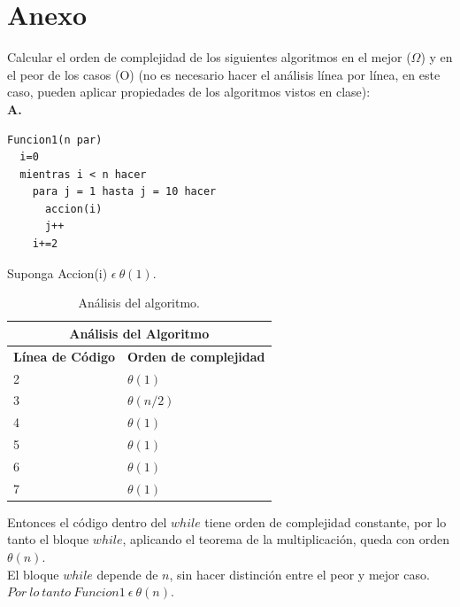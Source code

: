 \documentclass[12pt]{report}
\begin{document}
\section{Anexo}
	
Calcular el orden de complejidad de los siguientes algoritmos en el mejor ($\Omega$) y en el peor de los casos (O) (no es necesario hacer el análisis línea por línea, en este caso, pueden aplicar propiedades de los algoritmos vistos en clase):\\

	\textbf{A.}
	\lstset{language=vhdl, breaklines=true, basicstyle=\footnotesize}
	\lstset{numbers=left, numberstyle=\tiny, stepnumber=1, numbersep=10pt}
	\begin{lstlisting}
Funcion1(n par)
  i=0
  mientras i < n hacer
    para j = 1 hasta j = 10 hacer
      accion(i)
      j++
    i+=2
	\end{lstlisting}
	Suponga Accion(i) $\epsilon \ \theta (1).$\\
	
	\begin{table}[htbp]
		\begin{center}
			\begin{tabular}{|l|l|}
				\hline
				\multicolumn{2}{|c|}{Análisis del Algoritmo} \\ 
				\hline
				\textbf{Línea de Código} & \textbf{Orden de complejidad}\\
				\hline
				2 & $\theta (1)$ \\ \hline
				3 & $\theta (n/2)$ \\ \hline
				4 & $\theta (1)$ \\ \hline
				5 & $\theta (1)$ \\ \hline
				6 & $\theta (1)$ \\ \hline
				7 & $\theta (1)$ \\ \hline
			\end{tabular}
			\caption{Análisis del algoritmo.}
			\label{tabla:analisis3}
		\end{center}
	\end{table}
	
	Entonces el código dentro del $while$ tiene orden de complejidad constante, por lo tanto el bloque $while$, aplicando el teorema de la multiplicación, queda con orden $\theta (n)$.\\
	El bloque $while$ depende de $n$, sin hacer distinción entre el peor y mejor caso.\\
	
	$Por \ lo \ tanto \ Funcion1 \ \epsilon \ \theta (n)$.\newpage
		
\end{document}
